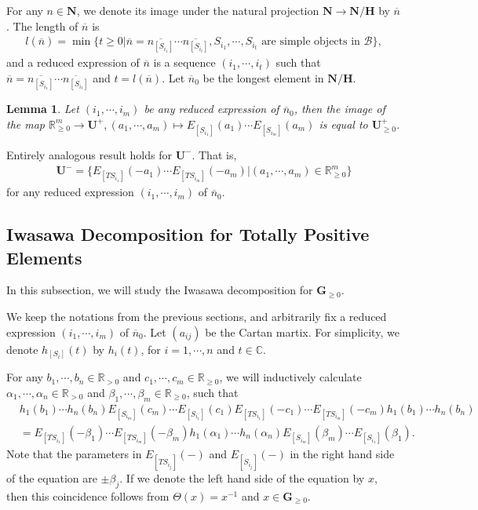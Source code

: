 \documentclass[12pt]{amsart}
\newtheorem{lemma}[theorem]{Lemma}
\begin{document}
For any $n\in \mathbf{N}$, we denote its image under the natural projection $\mathbf{N}\rightarrow \mathbf{N}/\mathbf{H}$ by $\overline{n}$.
The length of $\overline{n}$ is 
\begin{align*}
    l(\overline{n})=\operatorname{min} \{ t\geq 0| \overline{n}=\overline{n_{[S_{i_1}]}}\cdots  \overline{n_{[S_{i_t}]}}, S_{i_1},\cdots,S_{i_t} \text{ are simple objects in }\mathcal{B} \},
\end{align*}
and a reduced expression of $\overline{n}$ is a sequence $(i_1,\cdots,i_t)$ such that $ \overline{n}=\overline{n_{[S_{i_1}]}}\cdots  \overline{n_{[S_{i_t}]}}$ and $t=l(\overline{n})$.
Let $\overline{n}_0$ be the longest element in $\mathbf{N}/\mathbf{H}$.

\begin{lemma}\label{u>=0}
    \cite[Lemma 2.10]{TR1}
    Let $(i_1,\cdots,i_m)$ be any reduced expression of $\overline{n}_0$, then the image of the map $\mathbb{R}_{\geq 0}^m\rightarrow \mathbf{U}^+, (a_1,\cdots,a_m)\mapsto E_{[S_{i_1}]}(a_1)\cdots E_{[S_{i_m}]}(a_m)$ is equal to $\mathbf{U}_{\geq 0}^+$.
\end{lemma}

Entirely analogous result holds for $\mathbf{U}^-$. 
That is, 
\begin{align*}
    \mathbf{U}^-=\{ E_{[TS_{i_1}]}(-a_1)\cdots E_{[TS_{i_m}]}(-a_m)|(a_1,\cdots,a_m)\in \mathbb{R}_{\geq 0}^m         \}
\end{align*}
for any reduced expression $(i_1,\cdots,i_m)$ of $\overline{n}_0$.



\subsection{Iwasawa Decomposition for Totally Positive Elements}
In this subsection, we will study the Iwasawa decomposition for $\mathbf{G}_{\geq 0}$.

We keep the notations from the previous sections, and arbitrarily fix a reduced expression $(i_1,\cdots,i_m)$ of $\overline{n}_0$.
Let $(a_{ij})$ be the Cartan martix.
For simplicity, we denote $h_{[S_i]}(t)$ by $h_i(t)$, for $i=1,\cdots,n$ and $t\in \mathbb{C}$.

For any $b_1,\cdots,b_n\in \mathbb{R}_{>0}$ and $c_1,\cdots,c_m\in \mathbb{R}_{\geq 0}$, we will inductively calculate $\alpha_1,\cdots,\alpha_n\in \mathbb{R}_{>0}$ and $\beta_1,\cdots,\beta_m \in \mathbb{R}_{\geq 0}$, such that 
\begin{align*}
    &h_1(b_1)\cdots h_n(b_n) E_{[S_{i_m}]}(c_m) \cdots E_{[S_{i_1}]}(c_1)E_{[TS_{i_1}]}(-c_1)\cdots E_{[TS_{i_m}]}(-c_m) h_1(b_1)\cdots h_n(b_n) \\
    &= E_{[TS_{i_1}]}(-\beta_1)\cdots E_{[TS_{i_m}]}(-\beta_m)h_1(\alpha_1)\cdots h_n(\alpha_n) E_{[S_{i_m}]}(\beta_m)\cdots E_{[S_{i_1}]}(\beta_1).
\end{align*}
Note that the parameters in $E_{[TS_{i_j}]}(-)$ and $E_{[S_{i_j}]}(-)$ in the right hand side of the equation are $\pm \beta_j$. 
If we denote the left hand side of the equation by $x$, then this coincidence follows from $\Theta(x)=x^{-1}$ and $x\in \mathbf{G}_{\geq 0}$.
\end{document}
